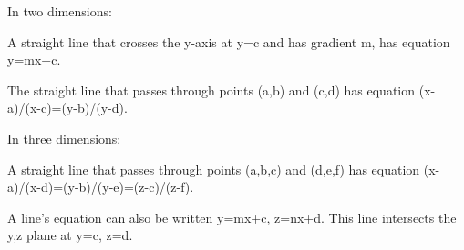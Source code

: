 In two dimensions:
\par
A straight line that crosses the y-axis at y=c and has gradient m, has
equation y=mx+c.
\par
The straight line that passes through points (a,b) and (c,d) has equation
(x-a)/(x-c)=(y-b)/(y-d).
\par
In three dimensions:
\par
A straight line that passes through points (a,b,c) and (d,e,f) has equation
(x-a)/(x-d)=(y-b)/(y-e)=(z-c)/(z-f).
\par
A line's equation can also be written y=mx+c, z=nx+d. This line intersects
the y,z plane at y=c, z=d.